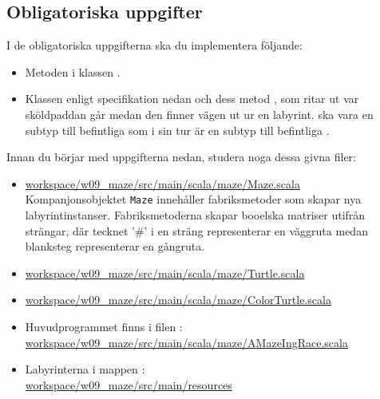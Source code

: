 \subsection{Obligatoriska uppgifter}

I de obligatoriska uppgifterna ska du implementera följande:
\begin{itemize}
\item Metoden  i klassen .

\item Klassen  enligt specifikation nedan och dess metod , som ritar ut var sköldpaddan går medan den finner vägen ut ur en labyrint.  ska vara en subtyp till befintliga  som i sin tur är en subtyp till befintliga .

\end{itemize}


\noindent Innan du börjar med uppgifterna nedan, studera noga dessa givna filer:
\begin{itemize}
\item
\href{https://github.com/lunduniversity/introprog/tree/master/workspace/w09_maze/src/main/scala/maze/Maze.scala}{workspace/w09\_maze/src/main/scala/maze/Maze.scala} \\
Kompanjonsobjektet \texttt{Maze} innehåller fabriksmetoder som skapar nya labyrintinstanser. Fabriksmetoderna  skapar booelska matriser utifrån strängar, där tecknet '\#' i en sträng representerar en väggruta medan blanksteg representerar en gångruta.

\item
\href{https://github.com/lunduniversity/introprog/tree/master/workspace/w09_maze/src/main/scala/maze/Turtle.scala}{workspace/w09\_maze/src/main/scala/maze/Turtle.scala}

\item
\href{https://github.com/lunduniversity/introprog/tree/master/workspace/w09_maze/src/main/scala/maze/ColorTurtle.scala}{workspace/w09\_maze/src/main/scala/maze/ColorTurtle.scala}

\item Huvudprogrammet  finns i filen :\\
\href{https://github.com/lunduniversity/introprog/tree/master/workspace/w09_maze/src/main/scala/maze/AMazeIngRace.scala}{workspace/w09\_maze/src/main/scala/maze/AMazeIngRace.scala}

\item Labyrinterna i mappen :\\
\href{https://github.com/lunduniversity/introprog/tree/master/workspace/w09_maze/src/main/resources}{workspace/w09\_maze/src/main/resources}

\end{itemize}


